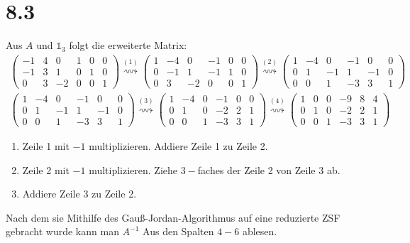 \documentclass[titlepage]{article}
\newcommand{\1}{\mathbb{1}}
\newcommand{\0}{\mathbb{0}}
\begin{document}
	\section*{8.3}
		Aus $A$ und $\1_3$ folgt die erweiterte Matrix:
		\begin{align*}
			\begin{pmatrix}
				-1&4&0&1&0&0\\
				-1&3&1&0&1&0\\
				0&3&-2&0&0&1
			\end{pmatrix}
			\overset{(1)}{\rightsquigarrow}
			\begin{pmatrix}
				1&-4&0&-1&0&0\\
				0&-1&1&-1&1&0\\
				0&3&-2&0&0&1
			\end{pmatrix}
			\overset{(2)}{\rightsquigarrow}
			\begin{pmatrix}
				1&-4&0&-1&0&0\\
				0&1&-1&1&-1&0\\
				0&0&1&-3&3&1
			\end{pmatrix}
		\end{align*}
		\begin{align*}
			\begin{pmatrix}
				1&-4&0&-1&0&0\\
				0&1&-1&1&-1&0\\
				0&0&1&-3&3&1
			\end{pmatrix}
			\overset{(3)}{\rightsquigarrow}
			\begin{pmatrix}
				1&-4&0&-1&0&0\\
				0&1&0&-2&2&1\\
				0&0&1&-3&3&1
			\end{pmatrix}
			\overset{(4)}{\rightsquigarrow}
			\begin{pmatrix}
				1&0&0&-9&8&4\\
				0&1&0&-2&2&1\\
				0&0&1&-3&3&1
			\end{pmatrix}
		\end{align*}
		\begin{enumerate}
			\item Zeile 1 mit $-1$ multiplizieren. Addiere Zeile 1 zu Zeile 2.
			\item Zeile 2 mit $-1$ multiplizieren. Ziehe $3-$faches der Zeile 2 von Zeile 3 ab.
			\item Addiere Zeile 3 zu Zeile 2.
		\end{enumerate}
		Nach dem sie Mithilfe des Gauß-Jordan-Algorithmus auf eine reduzierte ZSF gebracht wurde kann man $A^{-1}$ Aus den Spalten $4-6$ ablesen.
\end{document}
